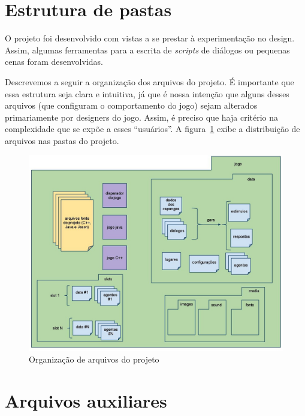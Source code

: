 \section{Estrutura de pastas}\label{estruturaPastas}

O projeto foi desenvolvido com vistas a se prestar à experimentação no
design. Assim, algumas ferramentas para a escrita de \emph{scripts} de
diálogos ou pequenas cenas foram desenvolvidas.

Descrevemos a seguir a organização dos arquivos do projeto. É
importante que essa estrutura seja clara e intuitiva, já que é nossa
intenção que alguns desses arquivos (que configuram o comportamento
do jogo) sejam alterados primariamente por designers do jogo. Assim, é
preciso que haja critério na complexidade que se expõe a esses
``usuários''. A figura~\ref{fig:estrut-arquiv} exibe a distribuição de arquivos nas pastas do projeto.  

\begin{figure}
\centering
\includegraphics[width=\textwidth]{figuras/estrutura-arquivos.jpg}
\caption{Organização de arquivos do projeto}
\label{fig:estrut-arquiv}
\end{figure}


\section{Arquivos auxiliares}


